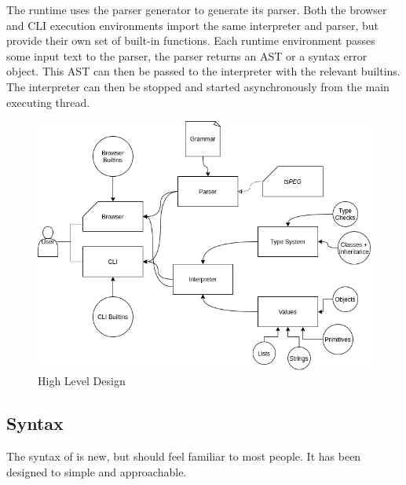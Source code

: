 The \Setanta{} runtime uses the \tsPEG{} parser generator to generate its parser. Both the browser and CLI execution environments import the same interpreter and parser, but provide their own set of built-in functions. Each runtime environment passes some input text to the parser, the parser returns an AST or a syntax error object. This AST can then be passed to the interpreter with the relevant builtins. The interpreter can then be stopped and started asynchronously from the main executing thread.

\begin{figure}
    \caption{\Setanta{} High Level Design}
    \label{setantadiagram}
    \begin{center}
    \includegraphics[scale=0.5]{setantadiagram}
    \end{center}
\end{figure}

\subsection{Syntax}

The syntax of \Setanta{} is new, but should feel familiar to most people. It has been designed to simple and approachable.

